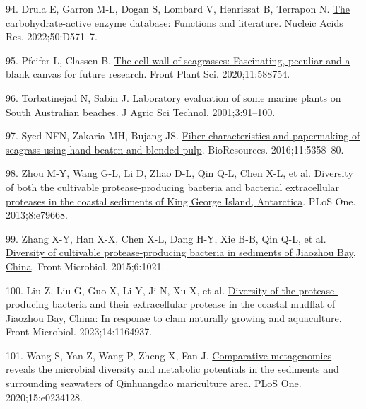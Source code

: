 \documentclass[
  12 pt,
]{article}
\newlength{\cslhangindent}
\newlength{\cslentryspacingunit} %
\newenvironment{CSLReferences}[2] %
 {%
  \setlength{\parindent}{0pt}
  \ifodd #1
  \let\oldpar\par
  \def\par{\hangindent=\cslhangindent\oldpar}
  \fi
  \setlength{\parskip}{#2\cslentryspacingunit}
 }%
 {}
\begin{document}
\begin{CSLReferences}{0}{0}
\leavevmode{}%
94. Drula E, Garron M-L, Dogan S, Lombard V, Henrissat B, Terrapon N. \href{https://doi.org/10.1093/nar/gkab1045}{The carbohydrate-active enzyme database: Functions and literature}. Nucleic Acids Res. 2022;50:D571--7.

\leavevmode{}%
95. Pfeifer L, Classen B. \href{https://doi.org/10.3389/fpls.2020.588754}{The cell wall of seagrasses: Fascinating, peculiar and a blank canvas for future research}. Front Plant Sci. 2020;11:588754.

\leavevmode{}%
96. Torbatinejad N, Sabin J. Laboratory evaluation of some marine plants on {South Australian} beaches. J Agric Sci Technol. 2001;3:91--100.

\leavevmode{}%
97. Syed NFN, Zakaria MH, Bujang JS. \href{https://doi.org/10.15376/biores.11.2.5358-5380}{Fiber characteristics and papermaking of seagrass using hand-beaten and blended pulp}. BioResources. 2016;11:5358--80.

\leavevmode{}%
98. Zhou M-Y, Wang G-L, Li D, Zhao D-L, Qin Q-L, Chen X-L, et al. \href{https://doi.org/10.1371/journal.pone.0079668}{Diversity of both the cultivable protease-producing bacteria and bacterial extracellular proteases in the coastal sediments of {King George Island}, {Antarctica}}. PLoS One. 2013;8:e79668.

\leavevmode{}%
99. Zhang X-Y, Han X-X, Chen X-L, Dang H-Y, Xie B-B, Qin Q-L, et al. \href{https://doi.org/10.3389/fmicb.2015.01021}{Diversity of cultivable protease-producing bacteria in sediments of {Jiaozhou Bay}, {China}}. Front Microbiol. 2015;6:1021.

\leavevmode{}%
100. Liu Z, Liu G, Guo X, Li Y, Ji N, Xu X, et al. \href{https://doi.org/10.3389/fmicb.2023.1164937}{Diversity of the protease-producing bacteria and their extracellular protease in the coastal mudflat of {Jiaozhou Bay}, {China}: In response to clam naturally growing and aquaculture}. Front Microbiol. 2023;14:1164937.

\leavevmode{}%
101. Wang S, Yan Z, Wang P, Zheng X, Fan J. \href{https://doi.org/10.1371/journal.pone.0234128}{Comparative metagenomics reveals the microbial diversity and metabolic potentials in the sediments and surrounding seawaters of {Qinhuangdao} mariculture area}. PLoS One. 2020;15:e0234128.


\end{CSLReferences}
\end{document}

